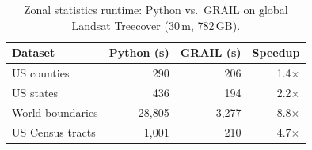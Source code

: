 \begin{table}[t]
\centering
\caption{Zonal statistics runtime: Python vs.\ GRAIL on global Landsat Treecover (30\,m, 782\,GB).}
\label{tab:benchmark}
\begin{tabular}{lrrr}
\toprule
\textbf{Dataset} & \textbf{Python (s)} & \textbf{GRAIL (s)} & \textbf{Speedup} \\
\midrule
US counties      & 290   & 206   & 1.4$\times$ \\
US states        & 436   & 194   & 2.2$\times$ \\
World boundaries & 28,805 & 3,277 & 8.8$\times$ \\
US Census tracts & 1,001 & 210   & 4.7$\times$ \\
\bottomrule
\end{tabular}
\end{table}